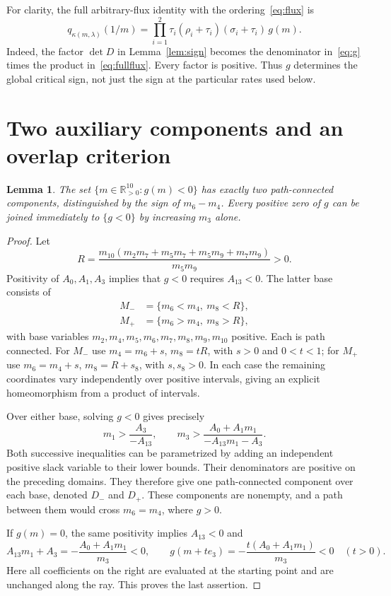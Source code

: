 \documentclass[11pt,a4paper]{article}
\numberwithin{equation}{section}
\newtheorem{lemma}[theorem]{Lemma}
\theoremstyle{remark}\newtheorem{remark}[theorem]{Remark}
\newcommand{\pos}{\mathbb{R}_{>0}}
\begin{document}
For clarity, the full arbitrary-flux identity with the ordering~\eqref{eq:flux} is
\begin{equation}\label{eq:fullflux}
q_{\kappa(m,\lambda)}(1/m)
=\prod_{i=1}^2\tau_i(\rho_i+\tau_i)(\sigma_i+\tau_i)\,g(m).
\end{equation}
Indeed, the factor $\det D$ in Lemma~\ref{lem:sign} becomes the denominator in~\eqref{eq:g} times the product in~\eqref{eq:fullflux}. Every factor is positive. Thus $g$ determines the global critical sign, not just the sign at the particular rates used below.

\section{Two auxiliary components and an overlap criterion}\label{sec:graph}
\begin{lemma}\label{lem:components}
The set $\{m\in\pos^{10}:g(m)<0\}$ has exactly two path-connected components, distinguished by the sign of $m_6-m_4$. Every positive zero of $g$ can be joined immediately to $\{g<0\}$ by increasing $m_3$ alone.
\end{lemma}
\begin{proof}
Let
\[
R=\frac{m_{10}(m_2m_7+m_5m_7+m_5m_9+m_7m_9)}{m_5m_9}>0.
\]
Positivity of $A_0,A_1,A_3$ implies that $g<0$ requires $A_{13}<0$. The latter base consists of
\begin{align*}
M_-&=\{m_6<m_4,\ m_8<R\},\\
M_+&=\{m_6>m_4,\ m_8>R\},
\end{align*}
with base variables $m_2,m_4,m_5,m_6,m_7,m_8,m_9,m_{10}$ positive. Each is path connected. For $M_-$ use $m_4=m_6+s$, $m_8=tR$, with $s>0$ and $0<t<1$; for $M_+$ use $m_6=m_4+s$, $m_8=R+s_8$, with $s,s_8>0$. In each case the remaining coordinates vary independently over positive intervals, giving an explicit homeomorphism from a product of intervals.

Over either base, solving $g<0$ gives precisely
\begin{equation}\label{eq:threshold}
m_1>\frac{A_3}{-A_{13}},\qquad
m_3>\frac{A_0+A_1m_1}{-A_{13}m_1-A_3}.
\end{equation}
Both successive inequalities can be parametrized by adding an independent positive slack variable to their lower bounds. Their denominators are positive on the preceding domains. They therefore give one path-connected component over each base, denoted $D_-$ and $D_+$. These components are nonempty, and a path between them would cross $m_6=m_4$, where $g>0$.

If $g(m)=0$, the same positivity implies $A_{13}<0$ and
\begin{equation}\label{eq:ray}
A_{13}m_1+A_3=-\frac{A_0+A_1m_1}{m_3}<0,\qquad
 g(m+te_3)=-\frac{t(A_0+A_1m_1)}{m_3}<0\quad(t>0).
\end{equation}
Here all coefficients on the right are evaluated at the starting point and are unchanged along the ray. This proves the last assertion.
\end{proof}
\end{document}
